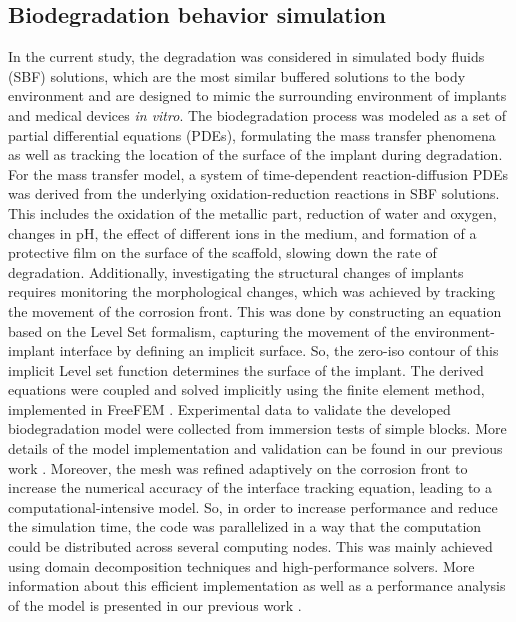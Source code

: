\subsection{Biodegradation behavior simulation}

In the current study, the degradation was considered in simulated body fluids (SBF) solutions, which are the most similar buffered solutions to the body environment and are designed to mimic the surrounding environment of implants and medical devices \textit{in vitro}. The biodegradation process was modeled as a set of partial differential equations (\gls{PDE}s), formulating the mass transfer phenomena as well as tracking the location of the surface of the implant during degradation. For the mass transfer model, a system of time-dependent reaction-diffusion \gls{PDE}s was derived from the underlying oxidation-reduction reactions in SBF solutions. This includes the oxidation of the metallic part, reduction of water and oxygen, changes in pH, the effect of different ions in the medium, and formation of a protective film on the surface of the scaffold, slowing down the rate of degradation. Additionally, investigating the structural changes of implants requires monitoring the morphological changes, which was achieved by tracking the movement of the corrosion front. This was done by constructing an equation based on the Level Set formalism, capturing the movement of the environment-implant interface by defining an implicit surface. So, the zero-iso contour of this implicit Level set function determines the surface of the implant. The derived equations were coupled and solved implicitly using the finite element method, implemented in FreeFEM \cite{Hecht2012}. Experimental data to validate the developed biodegradation model were collected from immersion tests of simple blocks. More details of the model implementation and validation can be found in our previous work \cite{Barzegari2021}. Moreover, the mesh was refined adaptively on the corrosion front to increase the numerical accuracy of the interface tracking equation, leading to a computational-intensive model. So, in order to increase performance and reduce the simulation time, the code was parallelized in a way that the computation could be distributed across several computing nodes. This was mainly achieved using domain decomposition techniques and high-performance solvers. More information about this efficient implementation as well as a performance analysis of the model is presented in our previous work \cite{Barzegari2022}.

